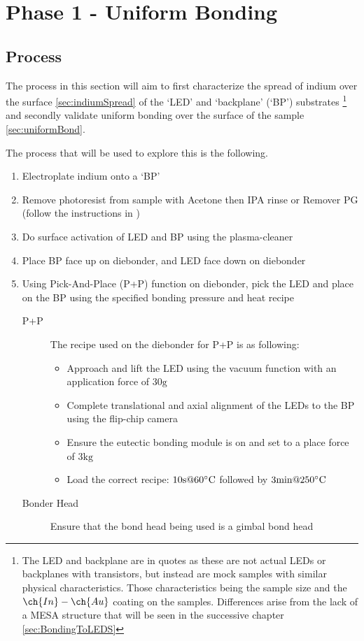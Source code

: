 \chapter{Phase 1 - Uniform Bonding}

\section{Process}
The process in this section will aim to first characterize the spread of indium over the surface \ref{sec:indiumSpread} of the `LED' and `backplane' (`BP') substrates
\footnote{The LED and backplane are in quotes as these are not actual LEDs or backplanes with transistors, but instead are mock samples with similar physical characteristics.
Those characteristics being the sample size and the $\ch{In}-\ch{Au}$ coating on the samples.
Differences arise from the lack of a MESA structure that will be seen in the successive chapter
\ref{sec:BondingToLEDS}}
and secondly validate uniform bonding over the surface of the sample \ref{sec:uniformBond}.

The process that will be used to explore this is the following.
\begin{enumerate}
    \item Electroplate indium onto a `BP'
    \item Remove photoresist from sample with Acetone then IPA rinse or Remover PG (follow the instructions in \cite{RemoverPGds})
    \item Do surface activation of LED and BP using the plasma-cleaner
    \item Place BP face up on diebonder, and LED face down on diebonder
    \item Using Pick-And-Place (P+P) function on diebonder, pick the LED and place on the BP using the specified bonding pressure and heat recipe
    \begin{description}
        \item[P+P] The recipe used on the diebonder for P+P is as following: \begin{itemize}
            \item Approach and lift the LED using the vacuum function with an application force of $30\unit{\gram}$
            \item Complete translational and axial alignment of the LEDs to the BP using the flip-chip camera
            \item Ensure the eutectic bonding module is on and set to a place force of $3\unit{\kilo\gram}$
            \item Load the correct recipe: $10\unit{\second} \text{@} 60\dC$ followed by $3\unit{\minute} \text{@} 250\dC$
        \end{itemize}
        \item[Bonder Head] Ensure that the bond head being used is a gimbal bond head
    \end{description}
\end{enumerate}


